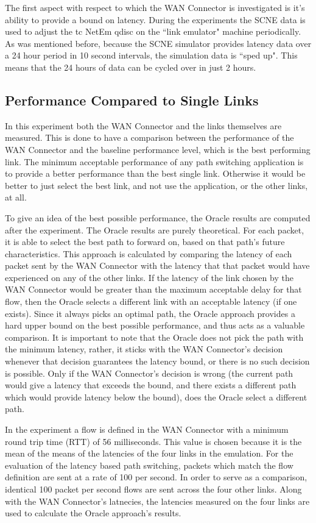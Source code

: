 The first aspect with respect to which the WAN Connector is investigated is it's ability to provide a bound on latency. During the experiments the SCNE data is used to adjust the tc NetEm qdisc on the “link emulator" machine periodically. As was mentioned before, because the SCNE simulator provides latency data over a 24 hour period in 10 second intervals, the simulation data is “sped up". This means that the 24 hours of data can be cycled over in just 2 hours.

\subsection{Performance Compared to Single Links}

In this experiment both the WAN Connector and the links themselves are measured. This is done to have a comparison between the performance of the WAN Connector and the baseline performance level, which is the best performing link. The minimum acceptable performance of any path switching application is to provide a better performance than the best single link. Otherwise it would be better to just select the best link, and not use the application, or the other links, at all.

To give an idea of the best possible performance, the Oracle results are computed after the experiment.  The Oracle results are purely theoretical. For each packet, it is able to select the best path to forward on, based on that path's future characteristics. This approach is calculated by comparing the latency of each packet sent by the WAN Connector with the latency that that packet would have experienced on any of the other links. If the latency of the link chosen by the WAN Connector would be greater than the maximum acceptable delay for that flow, then the Oracle selects a different link with an acceptable latency (if one exists). Since it always picks an optimal path, the Oracle approach provides a hard upper bound on the best possible performance, and thus acts as a valuable comparison. It is important to note that the Oracle does not pick the path with the minimum latency, rather, it sticks with the WAN Connector's decision whenever that decision guarantees the latency bound, or there is no such decision is possible. Only if the WAN Connector's decision is wrong (the current path would give a latency that exceeds the bound, and there exists a different path which would provide latency below the bound), does the Oracle select a different path.

In the experiment a flow is defined in the WAN Connector with a minimum round trip time (RTT) of 56 milliseconds. This value is chosen because it is the mean of the means of the latencies of the four links in the emulation. For the evaluation of the latency based path switching, packets which match the flow definition are sent at a rate of 100 per second. In order to serve as a comparison, identical 100 packet per second flows are sent across the four other links. Along with the WAN Connector's latnecies, the latencies measured on the four links are used to calculate the Oracle approach's results.

